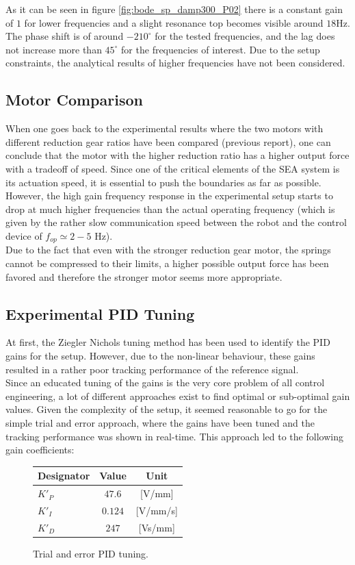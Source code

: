 As it can be seen in figure \ref{fig:bode_sp_damp300_P02} there is a constant gain of $1$ for lower frequencies and a slight resonance top becomes visible around $18$Hz. The phase shift is of around $-210^\circ$ for the tested frequencies, and the lag does not increase more than $45 ^\circ$ for the frequencies of interest. Due to the setup constraints, the analytical results of higher frequencies have not been considered.

\subsection{Motor Comparison}
When one goes back to the experimental results where the two motors with different reduction gear ratios have been compared (previous report), %
one can conclude that the motor with the higher reduction ratio has a higher output force with a tradeoff of speed. Since one of the critical elements of the SEA system is its actuation speed, it is essential to push the boundaries as far as possible. However, the high gain frequency response in the experimental setup starts to drop at much higher frequencies than the actual operating frequency (which is given by the rather slow communication speed between the robot and the control device of $f_{op} \simeq 2-5$ Hz).\\
Due to the fact that even with the stronger reduction gear motor, the springs cannot be compressed to their limits, a higher possible output force has been favored and therefore the stronger motor seems more appropriate.

\subsection{Experimental PID Tuning}
At first, the Ziegler Nichols tuning method has been used to identify the PID gains for the setup. However, due to the non-linear behaviour, these gains resulted in a rather poor tracking performance of the reference signal.\\
Since an educated tuning of the gains is the very core problem of all control engineering, a lot of different approaches exist to find optimal or sub-optimal gain values. Given the complexity of the setup, it seemed reasonable to go for the simple trial and error approach, where the gains have been tuned and the tracking performance was shown in real-time. This approach led to the following gain coefficients:

\begin{figure}[h!]
	\centering
	\begin{tabular}{|l|c|c|}
		\hline
		Designator & Value & Unit \\ \hline \hline
		$K'_P$ & $47.6$ & [V/mm]\\ 
		$K'_I$ & $0.124$ & [V/mm/s]\\
		$K'_D$ & $247$ & [Vs/mm]\\
		\hline
	\end{tabular}
	\caption{Trial and error PID tuning.}
	\label{tab:trial_error_pid}
\end{figure}


